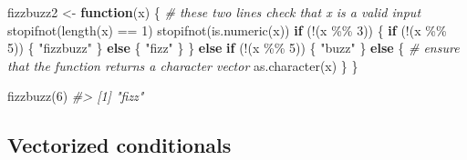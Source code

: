 \documentclass[
]{book}
\newenvironment{Shaded}{\begin{snugshade}}{\end{snugshade}}
\newcommand{\CommentTok}[1]{\textcolor[rgb]{0.56,0.35,0.01}{\textit{#1}}}
\newcommand{\ControlFlowTok}[1]{\textcolor[rgb]{0.13,0.29,0.53}{\textbf{#1}}}
\newcommand{\DecValTok}[1]{\textcolor[rgb]{0.00,0.00,0.81}{#1}}
\newcommand{\FunctionTok}[1]{\textcolor[rgb]{0.00,0.00,0.00}{#1}}
\newcommand{\NormalTok}[1]{#1}
\newcommand{\OtherTok}[1]{\textcolor[rgb]{0.56,0.35,0.01}{#1}}
\newcommand{\SpecialCharTok}[1]{\textcolor[rgb]{0.00,0.00,0.00}{#1}}
\newcommand{\StringTok}[1]{\textcolor[rgb]{0.31,0.60,0.02}{#1}}
\begin{document}
\begin{Shaded}
\begin{Highlighting}[]
\NormalTok{fizzbuzz2 }\OtherTok{\textless{}{-}} \ControlFlowTok{function}\NormalTok{(x) \{}
  \CommentTok{\# these two lines check that x is a valid input}
  \FunctionTok{stopifnot}\NormalTok{(}\FunctionTok{length}\NormalTok{(x) }\SpecialCharTok{==} \DecValTok{1}\NormalTok{)}
  \FunctionTok{stopifnot}\NormalTok{(}\FunctionTok{is.numeric}\NormalTok{(x))}
  \ControlFlowTok{if}\NormalTok{ (}\SpecialCharTok{!}\NormalTok{(x }\SpecialCharTok{\%\%} \DecValTok{3}\NormalTok{)) \{}
    \ControlFlowTok{if}\NormalTok{ (}\SpecialCharTok{!}\NormalTok{(x }\SpecialCharTok{\%\%} \DecValTok{5}\NormalTok{)) \{}
      \StringTok{"fizzbuzz"}
\NormalTok{    \} }\ControlFlowTok{else}\NormalTok{ \{}
      \StringTok{"fizz"}
\NormalTok{    \}}
\NormalTok{  \} }\ControlFlowTok{else} \ControlFlowTok{if}\NormalTok{ (}\SpecialCharTok{!}\NormalTok{(x }\SpecialCharTok{\%\%} \DecValTok{5}\NormalTok{)) \{}
    \StringTok{"buzz"}
\NormalTok{  \} }\ControlFlowTok{else}\NormalTok{ \{}
    \CommentTok{\# ensure that the function returns a character vector}
    \FunctionTok{as.character}\NormalTok{(x)}
\NormalTok{  \}}
\NormalTok{\}}
\end{Highlighting}
\end{Shaded}

\begin{Shaded}
\begin{Highlighting}[]
\FunctionTok{fizzbuzz}\NormalTok{(}\DecValTok{6}\NormalTok{)}
\CommentTok{\#\textgreater{} [1] "fizz"}
\end{Highlighting}
\end{Shaded}

\hypertarget{vectorized-conditionals}{%
\subsection{Vectorized conditionals}\label{vectorized-conditionals}}
\end{document}
